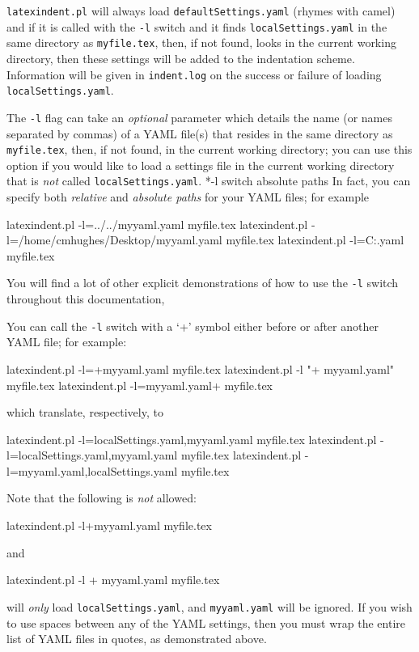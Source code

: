 	\label{page:localswitch}
	\texttt{latexindent.pl} will always load \texttt{defaultSettings.yaml} (rhymes with camel) and if it is called with the \texttt{-l} switch and it finds \texttt{localSettings.yaml} in the same directory as \texttt{myfile.tex}, then, if not found, looks in the current working directory, then these settings will be added to the indentation scheme.
	Information will be given in \texttt{indent.log} on the success or failure of loading \texttt{localSettings.yaml}.

	The \texttt{-l} flag can take an \emph{optional} parameter which details the name (or names separated by commas) of a YAML file(s) that resides in the same directory as \texttt{myfile.tex}, then, if not found, in the current working directory; you can use this option if you would like to load a settings file in the current working directory that is \emph{not} called \texttt{localSettings.yaml}.
	*{-l switch absolute paths}
	In fact, you can specify both \emph{relative} and \emph{absolute paths} for your YAML files; for example \begin{commandshell}
latexindent.pl -l=../../myyaml.yaml myfile.tex
latexindent.pl -l=/home/cmhughes/Desktop/myyaml.yaml myfile.tex
latexindent.pl -l=C:\Users\cmhughes\Desktop\myyaml.yaml myfile.tex
    \end{commandshell} You will find a lot of other explicit demonstrations of how to use the \texttt{-l} switch throughout this documentation, 

	You can call the \texttt{-l} switch with a `+' symbol either before or after%
	 another YAML file; for example: \begin{commandshell}
latexindent.pl -l=+myyaml.yaml  myfile.tex
latexindent.pl -l "+ myyaml.yaml" myfile.tex
latexindent.pl -l=myyaml.yaml+  myfile.tex
    \end{commandshell} which translate, respectively, to \begin{commandshell}
latexindent.pl -l=localSettings.yaml,myyaml.yaml myfile.tex
latexindent.pl -l=localSettings.yaml,myyaml.yaml myfile.tex
latexindent.pl -l=myyaml.yaml,localSettings.yaml myfile.tex
    \end{commandshell} Note that the following is \emph{not} allowed: \begin{commandshell}
latexindent.pl -l+myyaml.yaml myfile.tex
    \end{commandshell} and \begin{commandshell}
latexindent.pl -l + myyaml.yaml myfile.tex
    \end{commandshell} will \emph{only} load \texttt{localSettings.yaml}, and \texttt{myyaml.yaml} will be ignored.
	If you wish to use spaces between any of the YAML settings, then you must wrap the entire list of YAML files in quotes, as demonstrated above.

